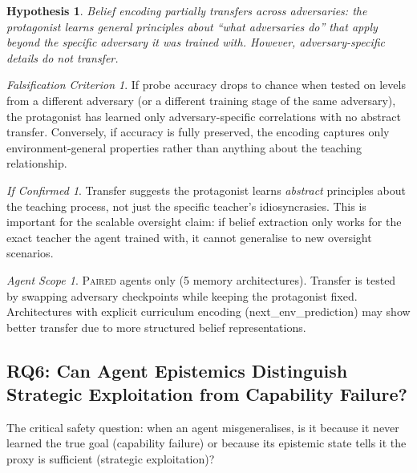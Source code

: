 \documentclass[11pt,a4paper]{article}
\newtheorem{hypothesis}{Hypothesis}[subsection]
\theoremstyle{remark}
\newtheorem*{falsification}{Falsification Criterion}
\newtheorem*{implication}{If Confirmed}
\newtheorem*{agentscope}{Agent Scope}
\newcommand{\paired}{\textsc{Paired}}
\begin{document}
\begin{hypothesis}
Belief encoding partially transfers across adversaries: the protagonist learns general principles about ``what adversaries do'' that apply beyond the specific adversary it was trained with. However, adversary-specific details do not transfer.
\end{hypothesis}

\begin{falsification}
If probe accuracy drops to chance when tested on levels from a different adversary (or a different training stage of the same adversary), the protagonist has learned only adversary-specific correlations with no abstract transfer. Conversely, if accuracy is fully preserved, the encoding captures only environment-general properties rather than anything about the teaching relationship.
\end{falsification}

\begin{implication}
Transfer suggests the protagonist learns \textit{abstract} principles about the teaching process, not just the specific teacher's idiosyncrasies. This is important for the scalable oversight claim: if belief extraction only works for the exact teacher the agent trained with, it cannot generalise to new oversight scenarios.
\end{implication}

\begin{agentscope}
\paired{} agents only (5 memory architectures). Transfer is tested by swapping adversary checkpoints while keeping the protagonist fixed. Architectures with explicit curriculum encoding (next\_env\_prediction) may show better transfer due to more structured belief representations.
\end{agentscope}

\subsection{RQ6: Can Agent Epistemics Distinguish Strategic Exploitation from Capability Failure?}
\label{sec:rq6}

The critical safety question: when an agent misgeneralises, is it because it never learned the true goal (capability failure) or because its epistemic state tells it the proxy is sufficient (strategic exploitation)?
\end{document}
